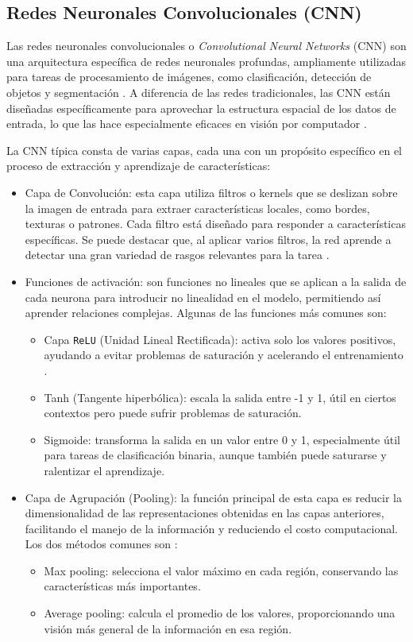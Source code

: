 \subsection{Redes Neuronales Convolucionales (CNN)}
Las redes neuronales convolucionales o \textit{Convolutional Neural Networks} (CNN) son una arquitectura específica de redes neuronales profundas, ampliamente utilizadas para tareas de procesamiento de imágenes, como clasificación, detección de objetos y segmentación \cite{gu2018cnn}. A diferencia de las redes tradicionales, las CNN están diseñadas específicamente para aprovechar la estructura espacial de los datos de entrada, lo que las hace especialmente eficaces en visión por computador \cite{ibmcnn}. 

La CNN típica consta de varias capas, cada una con un propósito específico en el proceso de extracción y aprendizaje de características:  
\begin{itemize}
    \item Capa de Convolución: esta capa utiliza filtros o kernels que se deslizan sobre la imagen de entrada para extraer características locales, como bordes, texturas o patrones. Cada filtro está diseñado para responder a características específicas. Se puede destacar que, al aplicar varios filtros, la red aprende a detectar una gran variedad de rasgos relevantes para la tarea \cite{sotil2022cnn}.
    \item Funciones de activación: son funciones no lineales que se aplican a la salida de cada neurona para introducir no linealidad en el modelo, permitiendo así aprender relaciones complejas. Algunas de las funciones más comunes son:
    \begin{itemize}
    \item Capa \texttt{ReLU} (Unidad Lineal Rectificada): activa solo los valores positivos, ayudando a evitar problemas de saturación y acelerando el entrenamiento \cite{ibmcnn}. 
    \item  Tanh (Tangente hiperbólica): escala la salida entre -1 y 1, útil en ciertos contextos pero puede sufrir problemas de saturación\cite{deeplearning2016}.
    \item Sigmoide: transforma la salida en un valor entre 0 y 1, especialmente útil para tareas de clasificación binaria, aunque también puede saturarse y ralentizar el aprendizaje\cite{deeplearning2016}.
    \end{itemize}
    \item Capa de Agrupación (Pooling): la función principal de esta capa es reducir la dimensionalidad de las representaciones obtenidas en las capas anteriores, facilitando el manejo de la información y reduciendo el costo computacional. Los dos métodos comunes son \cite{ajmal2018cnn, ibmcnn}:
    \begin{itemize}
        \item Max pooling: selecciona el valor máximo en cada región, conservando las características más importantes.
        \item Average pooling: calcula el promedio de los valores, proporcionando una visión más general de la información en esa región.
    \end{itemize}
\end{itemize}

